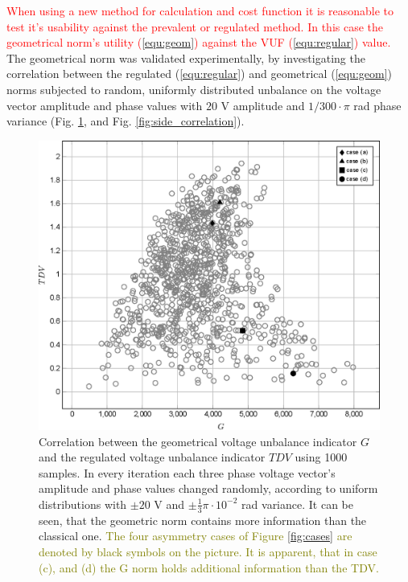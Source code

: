             \textcolor{red}{When using a new method for calculation and cost function it is reasonable to test it's usability against the prevalent or regulated method. In this case the geometrical norm's utility (\ref{equ:geom}) against the VUF (\ref{equ:regular}) value. }
            The geometrical norm was validated experimentally, by investigating the correlation between the regulated (\ref{equ:regular})  and geometrical (\ref{equ:geom}) norms subjected to random, uniformly distributed unbalance on the voltage vector amplitude and phase values with $20$ V amplitude and $1/300\cdot\pi$ rad phase variance (Fig. \ref{fig:correlation}, and Fig. \ref{fig:side_correlation}).

            \begin{figure}[!ht]
           \centering
           \includegraphics[width=\textwidth,scale=0.95]{Unblance_EPS_Pics/EPS_images/scatter.eps}
           \caption{Correlation between the geometrical voltage unbalance indicator $G$ and the regulated voltage unbalance indicator $TDV$ using 1000 samples. In every iteration each three phase voltage vector's amplitude and phase values changed randomly, according to uniform distributions with $\pm20$ V and $\pm\frac{1}{3}\pi\cdot10^{-2}$ rad variance. It can be seen, that the geometric norm contains more information than the classical one. \textcolor{olive}{The  four asymmetry cases of Figure \ref{fig:cases} are denoted by black symbols on the picture. It is apparent, that in case (c), and (d) the G norm holds additional information than the TDV.}}
           \label{fig:correlation}
            \end{figure}

